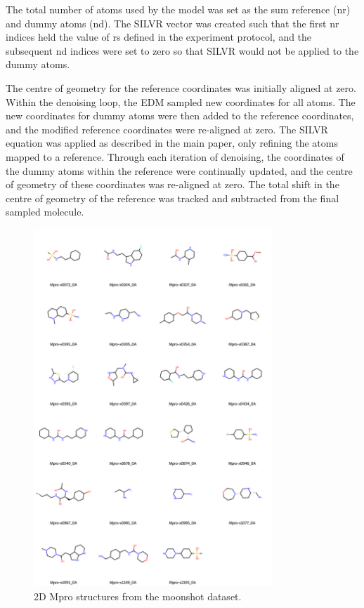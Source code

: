 \documentclass[journal=jacsat,manuscript=article]{achemso}
\begin{document}
\begin{suppinfo}
The total number of atoms used by the model was set as the sum reference (nr) and dummy atoms (nd). The SILVR vector was created such that the first nr indices held the value of rs defined in the experiment protocol, and the subsequent nd indices were set to zero so that SILVR would not be applied to the dummy atoms. 

The centre of geometry for the reference coordinates was initially aligned at zero. Within the denoising loop, the EDM sampled new coordinates for all atoms. The new coordinates for dummy atoms were then added to the reference coordinates, and the modified reference coordinates were re-aligned at zero. The SILVR equation was applied as described in the main paper, only refining the atoms mapped to a reference. Through each iteration of denoising, the coordinates of the dummy atoms within the reference were continually updated, and the centre of geometry of these coordinates was re-aligned at zero. The total shift in the centre of geometry of the reference was tracked and subtracted from the final sampled molecule. 


\begin{figure}
    \centering
    \includegraphics[width=0.8\textwidth]{paper/Figures/FigS1/mpro_ligands_grid_2d.png}
    \caption{2D Mpro structures from the moonshot dataset.}
    \label{fig:moonshot_data}
\end{figure}
\newpage


\end{suppinfo}
\end{document}
